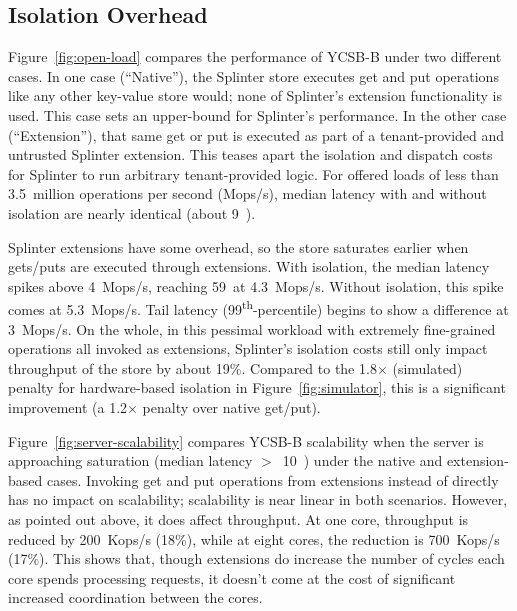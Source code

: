 \subsection{Isolation Overhead}
\label{sec:isolation-overhead}


Figure~\ref{fig:open-load} compares the performance of YCSB-B under two
different cases.
In one case (``Native''), the Splinter store executes get and put operations like
  any other key-value store would; none of Splinter's extension functionality
  is used.
This case sets an upper-bound for Splinter's performance.
In the other case (``Extension''), that same get or put is executed as part of a
  tenant-provided and untrusted Splinter extension.
This teases apart the isolation and dispatch costs for Splinter to run
  arbitrary tenant-provided logic.
For offered loads of less than 3.5~million operations per second (Mops/s), median
  latency with and without isolation are nearly identical (about 9~\us).

Splinter extensions have some overhead, so the store saturates
  earlier when gets/puts are executed through extensions.
With isolation, the median latency spikes above 4~Mops/s, reaching 59~\us at
  4.3~Mops/s.
Without isolation, this spike comes at 5.3~Mops/s.
Tail latency (99\textsuperscript{th}-percentile) begins to show a difference at
  3~Mops/s.
On the whole, in this pessimal workload with extremely fine-grained operations
  all invoked as extensions, Splinter's isolation costs still only impact
  throughput of the store by about 19\%.
Compared to the 1.8$\times$ (simulated) penalty for hardware-based
  isolation in Figure~\ref{fig:simulator}, this is a significant
  improvement (a 1.2$\times$ penalty over native get/put).

Figure~\ref{fig:server-scalability} compares YCSB-B scalability when the server
  is approaching saturation (median latency $>$~10~\us) under the native and
  extension-based cases.
Invoking get and put operations from extensions instead of directly has no
  impact on scalability; scalability is near linear in both scenarios.
However, as pointed out above, it does affect throughput.
At one core, throughput is reduced by 200~Kops/s (18\%), while at eight cores,
  the reduction is 700~Kops/s (17\%).
This shows that, though extensions do increase the number of cycles each core
  spends processing requests, it doesn't come at the cost of significant
  increased coordination between the cores.

